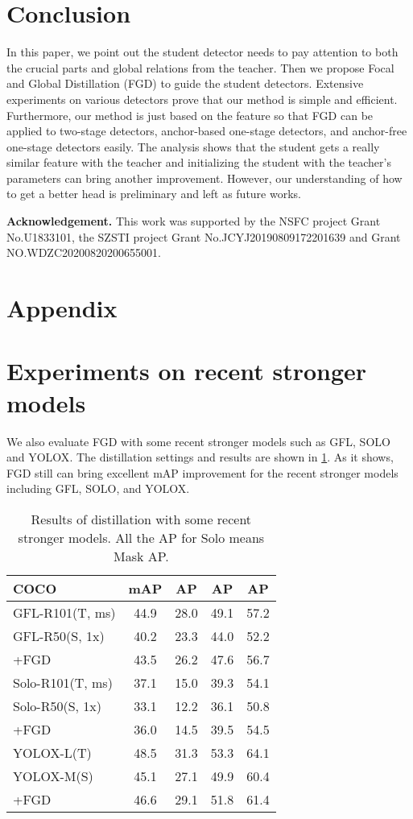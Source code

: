 \documentclass[10pt,twocolumn,letterpaper]{article}
\begin{document}
\section{Conclusion}
\label{sec:conclusion}
In this paper, we point out the student detector needs to pay attention to both the crucial parts and global relations from the teacher. Then we propose Focal and Global Distillation (FGD) to guide the student detectors. Extensive experiments on various detectors prove that our method is simple and efficient. Furthermore, our method is just based on the feature so that FGD can be applied to two-stage detectors, anchor-based one-stage detectors, and anchor-free one-stage detectors easily. The analysis shows that the student gets a really similar feature with the teacher and initializing the student with the teacher's parameters can bring another improvement. However, our understanding of how to get a better head is preliminary and left as future works. 

{\bf Acknowledgement.} This work was supported by the NSFC project Grant No.U1833101, the SZSTI project Grant No.JCYJ20190809172201639 and Grant NO.WDZC20200820200655001.


{\small


}

\clearpage
\appendix
\section*{Appendix}
\section{Experiments on recent stronger models}
We also evaluate FGD with some recent stronger models such as GFL\cite{li2020generalized}, SOLO\cite{wang2020solo} and YOLOX\cite{ge2021yolox}. The distillation settings and results are shown in \cref{table:extra results}. As it shows, FGD still can bring excellent mAP improvement for the recent stronger models including GFL, SOLO, and YOLOX.
\begin{table}
  \centering
  \begin{tabular}{l|cccc}
    \toprule
    {\bf COCO} & mAP & AP & AP & AP\\
    \midrule
    GFL-R101(T, ms) & 44.9 &28.0&49.1&57.2\\
    GFL-R50(S, 1x) & 40.2 &23.3&44.0&52.2\\
    +FGD & 43.5&26.2&47.6&56.7 \\
    \midrule
    Solo-R101(T, ms) & 37.1 &15.0&39.3&54.1\\
    Solo-R50(S, 1x) & 33.1 &12.2&36.1&50.8\\
    +FGD & 36.0&14.5&39.5&54.5\\
    \midrule
    YOLOX-L(T) & 48.5 &31.3&53.3&64.1\\
    YOLOX-M(S) & 45.1 &27.1&49.9&60.4\\
    +FGD & 46.6&29.1&51.8&61.4\\
    \bottomrule
  \end{tabular}
  \caption{Results of distillation with some recent stronger models. All the AP for Solo means Mask AP.}
 \label{table:extra results}
\end{table}
\end{document}
